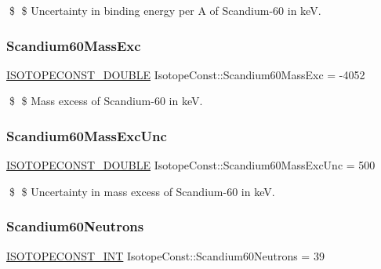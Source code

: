\$ \$ Uncertainty in binding energy per A of Scandium-\/60 in keV. \mbox{\label{group___isotope_const-_scandium-_sc60_ga0354e38e5e7222e040e8c4f3bd2ed62b}} 
\subsubsection{\texorpdfstring{Scandium60\+Mass\+Exc}{Scandium60MassExc}}
{\footnotesize\ttfamily \mbox{\hyperlink{group___isotope_const-_macros_ga8f45a7272ce02c0b4c65c44636ed719a}{I\+S\+O\+T\+O\+P\+E\+C\+O\+N\+S\+T\+\_\+\+D\+O\+U\+B\+LE}} Isotope\+Const\+::\+Scandium60\+Mass\+Exc = -\/4052}

\$ \$ Mass excess of Scandium-\/60 in keV. \mbox{\label{group___isotope_const-_scandium-_sc60_ga91ada14ed529f6a2b04ed4480d2764d3}} 
\subsubsection{\texorpdfstring{Scandium60\+Mass\+Exc\+Unc}{Scandium60MassExcUnc}}
{\footnotesize\ttfamily \mbox{\hyperlink{group___isotope_const-_macros_ga8f45a7272ce02c0b4c65c44636ed719a}{I\+S\+O\+T\+O\+P\+E\+C\+O\+N\+S\+T\+\_\+\+D\+O\+U\+B\+LE}} Isotope\+Const\+::\+Scandium60\+Mass\+Exc\+Unc = 500}

\$ \$ Uncertainty in mass excess of Scandium-\/60 in keV. \mbox{\label{group___isotope_const-_scandium-_sc60_gae1f3acc095c82fea71c9c35d8722ce73}} 
\subsubsection{\texorpdfstring{Scandium60\+Neutrons}{Scandium60Neutrons}}
{\footnotesize\ttfamily \mbox{\hyperlink{group___isotope_const-_macros_ga5f18360b3e99483a35c32d789e62621c}{I\+S\+O\+T\+O\+P\+E\+C\+O\+N\+S\+T\+\_\+\+I\+NT}} Isotope\+Const\+::\+Scandium60\+Neutrons = 39}

